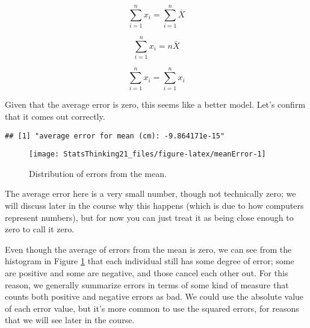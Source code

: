 \documentclass[]{book}
\newenvironment{Shaded}{\begin{snugshade}}{\end{snugshade}}
\newcommand{\KeywordTok}[1]{\textcolor[rgb]{0.13,0.29,0.53}{\textbf{#1}}}
\newcommand{\StringTok}[1]{\textcolor[rgb]{0.31,0.60,0.02}{#1}}
\newcommand{\CommentTok}[1]{\textcolor[rgb]{0.56,0.35,0.01}{\textit{#1}}}
\newcommand{\OperatorTok}[1]{\textcolor[rgb]{0.81,0.36,0.00}{\textbf{#1}}}
\newcommand{\NormalTok}[1]{#1}
\theoremstyle{definition}
\theoremstyle{definition}
\theoremstyle{definition}
\theoremstyle{remark}
\begin{document}
\[
\sum_{i=1}^{n}x_i = \sum_{i=1}^{n}\bar{X}
\]

\[
\sum_{i=1}^{n}x_i = n\bar{X}
\]

\[
\sum_{i=1}^{n}x_i = \sum_{i=1}^{n}x_i
\]

Given that the average error is zero, this seems like a better model.
Let's confirm that it comes out correctly.

\begin{Shaded}
\end{Shaded}

\begin{verbatim}
## [1] "average error for mean (cm): -9.864171e-15"
\end{verbatim}

\begin{figure}
\texttt{[image: StatsThinking21\_files/figure-latex/meanError-1]} \caption{Distribution of errors from the mean.}\label{fig:meanError}
\end{figure}

The average error here is a very small number, though not technically
zero; we will discuss later in the course why this happens (which is due
to how computers represent numbers), but for now you can just treat it
as being close enough to zero to call it zero.

Even though the average of errors from the mean is zero, we can see from
the histogram in Figure \ref{fig:meanError} that each individual still
has some degree of error; some are positive and some are negative, and
those cancel each other out. For this reason, we generally summarize
errors in terms of some kind of measure that counts both positive and
negative errors as bad. We could use the absolute value of each error
value, but it's more common to use the squared errors, for reasons that
we will see later in the course.
\end{document}
